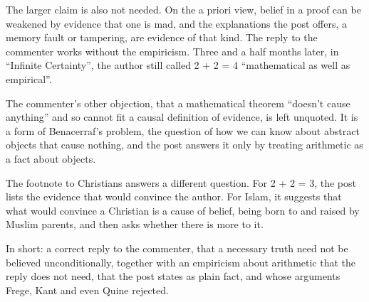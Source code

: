 \begin{afterword}
The larger claim is also not needed. On the a priori view, belief in a proof can be weakened by evidence that one is mad, and the explanations the post offers, a memory fault or tampering, are evidence of that kind. The reply to the commenter works without the empiricism. Three and a half months later, in ``Infinite Certainty'', the author still called 2 + 2 = 4 ``mathematical as well as empirical''.

The commenter's other objection, that a mathematical theorem ``doesn't cause anything'' and so cannot fit a causal definition of evidence, is left unquoted. It is a form of Benacerraf's problem, the question of how we can know about abstract objects that cause nothing, and the post answers it only by treating arithmetic as a fact about objects.

The footnote to Christians answers a different question. For 2 + 2 = 3, the post lists the evidence that would convince the author. For Islam, it suggests that what would convince a Christian is a cause of belief, being born to and raised by Muslim parents, and then asks whether there is more to it.

In short: a correct reply to the commenter, that a necessary truth need not be believed unconditionally, together with an empiricism about arithmetic that the reply does not need, that the post states as plain fact, and whose arguments Frege, Kant and even Quine rejected.
\end{afterword}
